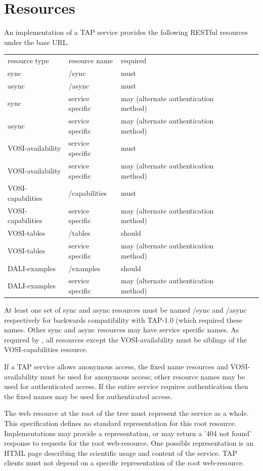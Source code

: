 \documentclass[11pt,letter]{ivoa}
\begin{document}
\section{Resources}
\label{sec:resources}

An implementation of a TAP service provides the following RESTful resources 
under the base URL.

\begin{tabular}{l l l l l}
\label{tab:resources}
resource type & resource name & required \\
{sync} & /sync & must & \\
{async} & /async & must & \\
{sync} & service specific & may (alternate authentication method) & \\
{async} & service specific & may (alternate authentication method) & \\
VOSI-availability & service specific & must & \\
VOSI-availability & service specific & may (alternate authentication method) & \\
VOSI-capabilities & /capabilities & must & \\
VOSI-capabilities & service specific & may (alternate authentication method) & \\
VOSI-tables & /tables & should & \\
VOSI-tables & service specific & may (alternate authentication method) & \\
DALI-examples & /examples & should & \\
DALI-examples & service specific & may (alternate authentication method) & \\
\end{tabular}

At least one set of {sync} and {async} resources must be named /sync and 
/async respectively for backwards compatibility with TAP-1.0 (which required 
these names. Other  {sync} and {async} resources may have service specific names. 
As required by \citep{std:DALI}, all resources except the VOSI-availability must 
be siblings of the VOSI-capabilities resource. 

If a TAP service allows anonymous access, the fixed name resources and VOSI-availability
must be used for anonymous access; other resource names may be used for authenticated access. 
If the entire service requires authentication then the fixed names may be used for 
authenticated access.

The web resource at the root of the tree must represent the service as a whole. 
This specification defines no standard representation for this root resource. 
Implementations may provide a representation, or may return a '404 not found' 
response to requests for the root web-resource. One possible representation is 
an HTML page describing the scientific usage and content of the service. TAP 
clients must not depend on a specific representation of the root web-resource.
\end{document}
